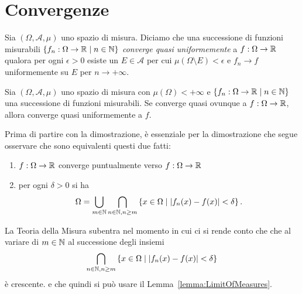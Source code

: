 
\section{Convergenze}

\begin{definizione}
Sia \((\Omega, \mathcal A, \mu)\) uno spazio di misura. Diciamo che  una successione di funzioni misurabili \(\left\{f_n : \Omega \to \mathbb R \mid n \in \mathbb N\right\}\) {\em converge quasi uniformemente} a \(f : \Omega \to \mathbb R\) qualora per ogni \(\epsilon > 0\) esiste un \(E \in \mathcal A\) per cui \(\mu(\Omega \setminus E) < \epsilon\) e \(f_n \to f\) uniformemente su \(E\) per \(n \to +\infty\).
\end{definizione}

\begin{proposizione}\label{proposizione:SeveriniEgorov}
Sia \((\Omega, \mathcal A, \mu)\) uno spazio di misura con \(\mu(\Omega) < +\infty\) e \(\left\{f_n : \Omega \to \mathbb R \mid n \in \mathbb N\right\}\) una successione di funzioni misurabili. Se converge quasi ovunque a \(f : \Omega \to \mathbb R\), allora converge quasi uniformemente a \(f\). 
\end{proposizione}

Prima di partire con la dimostrazione, è essenziale per la dimostrazione che segue osservare che sono equivalenti questi due fatti:
\begin{enumerate}
\item \(f : \Omega \to \mathbb R\) converge puntualmente verso \(f : \Omega \to \mathbb R\)
\item per ogni \(\delta > 0\) si ha
\[\Omega = \bigcup_{m \in \mathbb N} \bigcap_{n \in \mathbb N, n \ge m} \left\{x \in \Omega \mid \left\lvert f_n(x) - f(x)\right\rvert < \delta\right\} .\]
\end{enumerate}
La Teoria della Misura subentra nel momento in cui ci si rende conto che che al variare di \(m \in \mathbb N\) al successione degli insiemi
\[\bigcap_{n \in \mathbb N, n \ge m} \left\{x \in \Omega \mid \left\lvert f_n(x) - f(x)\right\rvert < \delta\right\}\]
è crescente. e che quindi si può usare il Lemma~\ref{lemma:LimitOfMeasures}.

